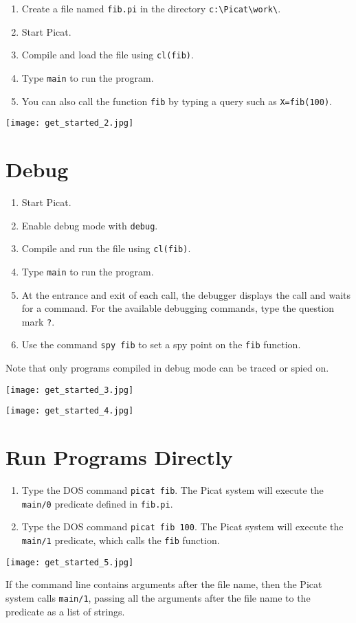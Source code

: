 \documentclass{article}[12pt]
\begin{document}
\begin{enumerate}
\item Create a file named \texttt{fib.pi} in the directory \verb+c:\Picat\work\+.
\item Start Picat.
\item Compile and load the file using \texttt{cl(fib)}.
\item Type \texttt{main} to run the program.
\item You can also call the function {\tt fib} by typing a query such as \verb+X=fib(100)+.
\end{enumerate}

\texttt{[image: get\_started\_2.jpg]}

\clearpage

\section*{\Large{Debug}}
\begin{enumerate}
\item Start Picat.
\item Enable debug mode with \texttt{debug}.
\item Compile and run the file using \texttt{cl(fib)}.
\item Type \texttt{main} to run the program.
\item At the entrance and exit of each call, the debugger displays the call and waits for a command. For the available debugging commands, type the question mark \texttt{?}.
\item Use the command \texttt{spy fib} to set a spy point on the \texttt{fib} function.
\end{enumerate}
Note that only programs compiled in debug mode can be traced or spied on. 

\texttt{[image: get\_started\_3.jpg]}

\texttt{[image: get\_started\_4.jpg]}

\section*{\Large{Run Programs Directly}}
\begin{enumerate}
\item Type the DOS command \texttt{picat fib}. The Picat system will execute the \texttt{main/0} predicate defined in \texttt{fib.pi}.

\item Type the DOS command \texttt{picat fib 100}. The Picat system will execute the \texttt{main/1} predicate, which calls the \texttt{fib} function.
\end{enumerate}

\texttt{[image: get\_started\_5.jpg]}

If the command line contains arguments after the file name, then the Picat system calls \texttt{main/1}, passing all the arguments after the file name to the predicate as a list of strings.
\end{document}
